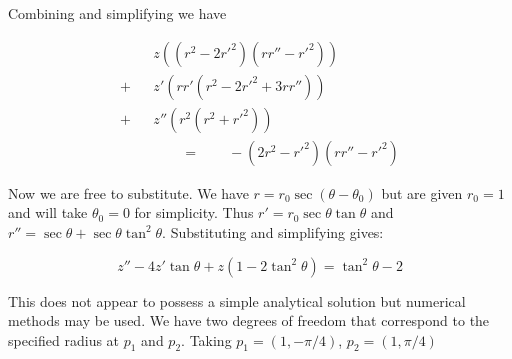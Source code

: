 \documentclass[pdflatex,sn-mathphys-num]{sn-jnl}%
\theoremstyle{thmstyleone}%
\theoremstyle{thmstyletwo}%
\theoremstyle{thmstylethree}%
\begin{document}
Combining and simplifying we have

\begin{eqnarray}
 &{}&z  \left((r^2 - 2r'^2)(rr''-r'^2)\right)\nonumber\\
+&{}&z'  \left(rr'(r^2 - 2r'^2 + 3rr'')\right)\nonumber\\
+&{}&z''  \left(r^2    (r^2+r'^2)       \right)\\
&{}&\qquad =\qquad -(2r^2-r'^2)(rr''-r'^2)
\end{eqnarray}

Now we are free to substitute.  We have $r=r_0\sec(\theta-\theta_0)$
but are given $r_0=1$ and will take $\theta_0=0$ for simplicity.  Thus
$r'= r_0\sec\theta\tan\theta$ and $r''=\sec\theta +
\sec\theta\tan^2\theta$.  Substituting and simplifying gives:

\begin{equation}\label{string_ODE}
z'' - 4z'\tan \theta + z(1-2\tan^2\theta) = \tan^2\theta - 2
\end{equation}


This does not appear to possess a simple analytical solution but
numerical methods may be used.  We have two degrees of freedom that
correspond to the specified radius at $p_1$ and $p_2$.  Taking
$p_1=(1,-\pi/4)$, $p_2=(1,\pi/4)$




\end{document}
